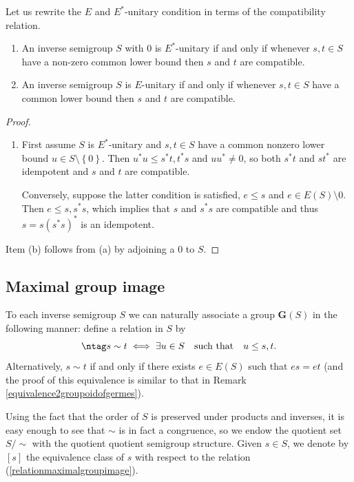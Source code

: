 Let us rewrite the $E$ and $E^*$-unitary condition in terms of the compatibility relation.

\begin{lemma}\cite[Theorem~2.4.6]{MR1694900}\label{lemmacompatibilityeunitary}
\begin{enumerate}
\item[(a)] An inverse semigroup $S$ with $0$ is $E^*$-unitary if and only if whenever $s,t\in S$ have a non-zero common lower bound then $s$ and $t$ are compatible.
\item[(b)] An inverse semigroup $S$ is $E$-unitary if and only if whenever $s,t\in S$ have a common lower bound then $s$ and $t$ are compatible.
\end{enumerate}
\end{lemma}
\begin{proof}
\begin{enumerate}
\item[(a)] First assume $S$ is $E^*$-unitary and $s,t\in S$ have a common nonzero lower bound $u\in S\setminus\left\{0\right\}$. Then $u^*u\leq s^*t,t^*s$ and $uu^*\neq 0$, so both $s^*t$ and $st^*$ are idempotent and $s$ and $t$ are compatible. 

Conversely, suppose the latter condition is satisfied, $e\leq s$ and $e\in E(S)\setminus 0$. Then $e\leq s, s^*s$, which implies that $s$ and $s^*s$ are compatible and thus $s=s(s^*s)^*$ is an idempotent.
\end{enumerate}
Item (b) follows from (a) by adjoining a $0$ to $S$.\qedhere
\end{proof}

\subsection{Maximal group image}\label{subsectionmaximalgroupimage}

To each inverse semigroup $S$ we can naturally associate a group $\mathbf{G}(S)$ in the following manner: define a relation in $S$ by
\[\ntag\label{relationmaximalgroupimage}
s\sim t\iff\exists u\in S\quad\text{such that}\quad u\leq s,t.\]
Alternatively, $s\sim t$ if and only if there exists $e\in E(S)$ such that $es=et$ (and the proof of this equivalence is similar to that in Remark \ref{equivalence2groupoidofgermes}).

Using the fact that the order of $S$ is preserved under products and inverses, it is easy enough to see that $\sim$ is in fact a congruence, so we endow the quotient set $S/{\sim}$ with the quotient quotient semigroup structure. Given $s\in S$, we denote by $[s]$ the equivalence class of $s$ with respect to the relation (\ref{relationmaximalgroupimage}).

